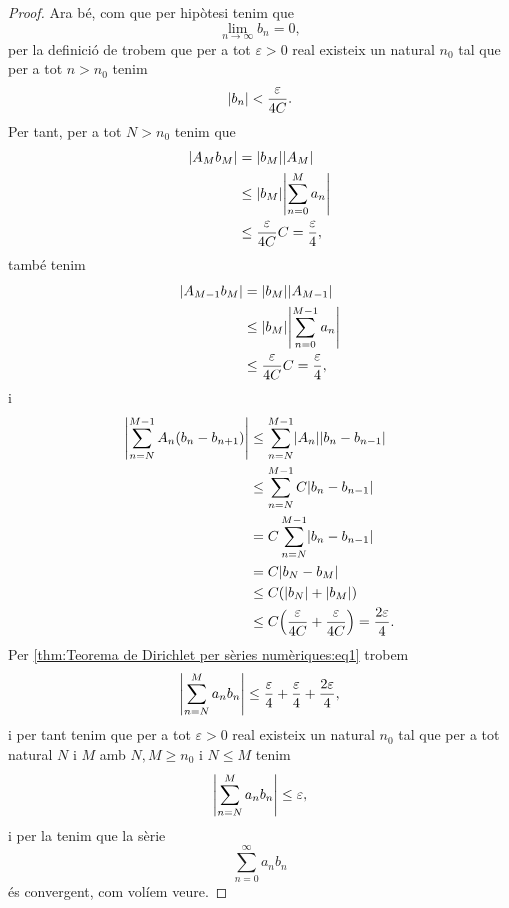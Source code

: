 \documentclass[../Apunts.tex]{subfiles}
\begin{document}
\begin{theorem}
\begin{proof}
			Ara bé, com que per hipòtesi tenim que
			\[\lim_{n\to\infty}b_{n}=0,\]
			per la definició de  trobem que per a tot \(\varepsilon>0\) real existeix un natural \(n_{0}\) tal que per a tot \(n>n_{0}\) tenim
			\[\abs{b_{n}}<\frac{\varepsilon}{4C}.\]
			Per tant, per a tot \(N>n_{0}\) tenim que
			\begin{align*}
				\abs{A_{M}b_{M}}&=\abs{b_{M}}\abs{A_{M}} \\
				&\leq\abs{b_{M}}\abs{\sum_{n=0}^{M}a_{n}} \\ %
				&\leq\frac{\varepsilon}{4C}C=\frac{\varepsilon}{4},
			\end{align*}
			també tenim
			\begin{align*}
				\abs{A_{M-1}b_{M}}&=\abs{b_{M}}\abs{A_{M-1}} \\
				&\leq\abs{b_{M}}\abs{\sum_{n=0}^{M-1}a_{n}} \\ %
				&\leq\frac{\varepsilon}{4C}C=\frac{\varepsilon}{4},
			\end{align*}
			i
			\begin{align*}
				\abs{\sum_{n=N}^{M-1}A_{n}(b_{n}-b_{n+1})}&\leq\sum_{n=N}^{M-1}\abs{A_{n}}\abs{b_{n}-b_{n-1}} \\
				&\leq\sum_{n=N}^{M-1}C\abs{b_{n}-b_{n-1}} \\
				&=C\sum_{n=N}^{M-1}\abs{b_{n}-b_{n-1}} \\
				&=C\abs{b_{N}-b_{M}} \\
				&\leq C(\abs{b_{N}}+\abs{b_{M}}) \\
				&\leq C\left(\frac{\varepsilon}{4C}+\frac{\varepsilon}{4C}\right)=\frac{2\varepsilon}{4}.
			\end{align*}
			Per \eqref{thm:Teorema de Dirichlet per sèries numèriques:eq1} trobem
			\[\abs{\sum_{n=N}^{M}a_{n}b_{n}}\leq\frac{\varepsilon}{4}+\frac{\varepsilon}{4}+\frac{2\varepsilon}{4},\]
			i per tant tenim que per a tot \(\varepsilon>0\) real existeix un natural \(n_{0}\) tal que per a tot natural \(N\) i \(M\) amb \(N,M\geq n_{0}\) i \(N\leq M\) tenim
			\[\abs{\sum_{n=N}^{M}a_{n}b_{n}}\leq\varepsilon,\]
			i per la  tenim que la sèrie
			\[\sum_{n=0}^{\infty}a_{n}b_{n}\]
			és convergent, com volíem veure.
		\end{proof}
	\end{theorem}
\end{document}
